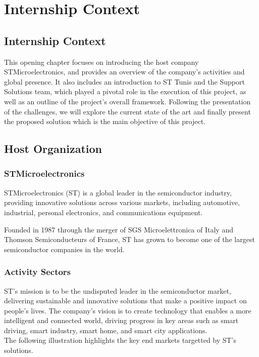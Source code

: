 \chapter{Internship Context}
\label{chap:premierchapitre}
\section*{Internship Context}
This opening chapter focuses on introducing the host company STMicroelectronics, and provides an overview of the company's activities and global presence. It also includes an introduction to ST Tunis and the Support Solutions team, which played a pivotal role in the execution of this project, as well as an outline of the project's overall framework. Following the presentation of the challenges, we will explore the current state of the art and finally present the proposed solution which is the main objective of this project.

\section{Host Organization}
\subsection{STMicroelectronics}

STMicroelectronics (ST) is a global leader in the semiconductor industry, providing innovative solutions across various markets, including automotive, industrial, personal electronics, and communications equipment.

Founded in 1987 through the merger of SGS Microelettronica of Italy and Thomson Semiconducteurs of France, ST has grown to become one of the largest semiconductor companies in the world.

\subsection{Activity Sectors}

ST's mission is to be the undisputed leader in the semiconductor market, delivering sustainable and innovative solutions that make a positive impact on people's lives. The company's vision is to create technology that enables a more intelligent and connected world, driving progress in key areas such as smart driving, smart industry, smart home, and smart city applications.\\
The following illustration highlights the key end markets targetted by ST's solutions.

